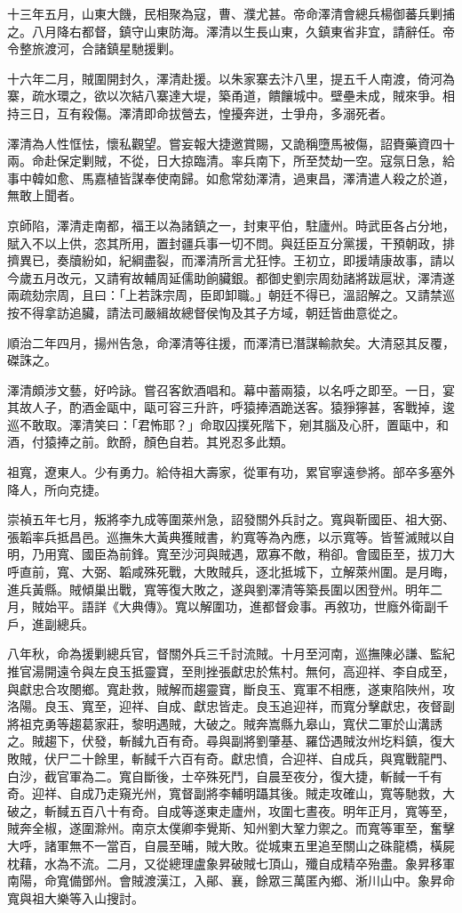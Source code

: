 \begin{pinyinscope}
十三年五月，山東大饑，民相聚為寇，曹、濮尤甚。帝命澤清會總兵楊御蕃兵剿捕之。八月降右都督，鎮守山東防海。澤清以生長山東，久鎮東省非宜，請辭任。帝令整旅渡河，合諸鎮星馳援剿。

十六年二月，賊圍開封久，澤清赴援。以朱家寨去汴八里，提五千人南渡，倚河為寨，疏水環之，欲以次結八寨達大堤，築甬道，饋饟城中。壁壘未成，賊來爭。相持三日，互有殺傷。澤清即命拔營去，惶擾奔迸，士爭舟，多溺死者。

澤清為人性恇怯，懷私觀望。嘗妄報大捷邀賞賜，又詭稱墮馬被傷，詔賚藥資四十兩。命赴保定剿賊，不從，日大掠臨清。率兵南下，所至焚劫一空。寇氛日急，給事中韓如愈、馬嘉植皆謀奉使南歸。如愈常劾澤清，過東昌，澤清遣人殺之於道，無敢上聞者。

京師陷，澤清走南都，福王以為諸鎮之一，封東平伯，駐廬州。時武臣各占分地，賦入不以上供，恣其所用，置封疆兵事一切不問。與廷臣互分黨援，干預朝政，排擠異已，奏牘紛如，紀綱盡裂，而澤清所言尤狂悖。王初立，即援靖康故事，請以今歲五月改元，又請宥故輔周延儒助餉臟銀。都御史劉宗周劾諸將跋扈狀，澤清遂兩疏劾宗周，且曰：「上若誅宗周，臣即卸職。」朝廷不得已，溫詔解之。又請禁巡按不得拿訪追臟，請法司嚴緝故總督侯恂及其子方域，朝廷皆曲意從之。

順治二年四月，揚州告急，命澤清等往援，而澤清已潛謀輸款矣。大清惡其反覆，磔誅之。

澤清頗涉文藝，好吟詠。嘗召客飲酒唱和。幕中蓄兩猿，以名呼之即至。一日，宴其故人子，酌酒金甌中，甌可容三升許，呼猿捧酒跪送客。猿猙獰甚，客戰掉，逡巡不敢取。澤清笑曰：「君怖耶？」命取囚撲死階下，剜其腦及心肝，置甌中，和酒，付猿捧之前。飲酹，顏色自若。其兇忍多此類。

祖寬，遼東人。少有勇力。給侍祖大壽家，從軍有功，累官寧遠參將。部卒多塞外降人，所向克捷。

崇禎五年七月，叛將李九成等圍萊州急，詔發關外兵討之。寬與靳國臣、祖大弼、張韜率兵抵昌邑。巡撫朱大黃典獲賊書，約寬等為內應，以示寬等。皆誓滅賊以自明，乃用寬、國臣為前鋒。寬至沙河與賊遇，眾寡不敵，稍卻。會國臣至，拔刀大呼直前，寬、大弼、韜咸殊死戰，大敗賊兵，逐北抵城下，立解萊州圍。是月晦，進兵黃縣。賊傾巢出戰，寬等復大敗之，遂與劉澤清等築長圍以困登州。明年二月，賊始平。語詳《大典傳》。寬以解圍功，進都督僉事。再敘功，世廕外衛副千戶，進副總兵。

八年秋，命為援剿總兵官，督關外兵三千討流賊。十月至河南，巡撫陳必謙、監紀推官湯開遠令與左良玉抵靈寶，至則挫張獻忠於焦村。無何，高迎祥、李自成至，與獻忠合攻閿鄉。寬赴救，賊解而趨靈寶，斷良玉、寬軍不相應，遂東陷陜州，攻洛陽。良玉、寬至，迎祥、自成、獻忠皆走。良玉追迎祥，而寬分擊獻忠，夜督副將祖克勇等趨葛家莊，黎明遇賊，大破之。賊奔嵩縣九皋山，寬伏二軍於山溝誘之。賊趨下，伏發，斬馘九百有奇。尋與副將劉肇基、羅岱遇賊汝州圪料鎮，復大敗賊，伏尸二十餘里，斬馘千六百有奇。獻忠憤，合迎祥、自成兵，與寬戰龍門、白沙，截官軍為二。寬自斷後，士卒殊死鬥，自晨至夜分，復大捷，斬馘一千有奇。迎祥、自成乃走窺光州，寬督副將李輔明躡其後。賊走攻確山，寬等馳救，大破之，斬馘五百八十有奇。自成等遂東走廬州，攻圍七晝夜。明年正月，寬等至，賊奔全椒，遂圍滁州。南京太僕卿李覺斯、知州劉大鞏力禦之。而寬等軍至，奮擊大呼，諸軍無不一當百，自晨至晡，賊大敗。從城東五里追至關山之硃龍橋，橫屍枕藉，水為不流。二月，又從總理盧象昇破賊七頂山，殲自成精卒殆盡。象昇移軍南陽，命寬備鄧州。會賊渡漢江，入鄖、襄，餘眾三萬匿內鄉、淅川山中。象昇命寬與祖大樂等入山搜討。


\end{pinyinscope}
